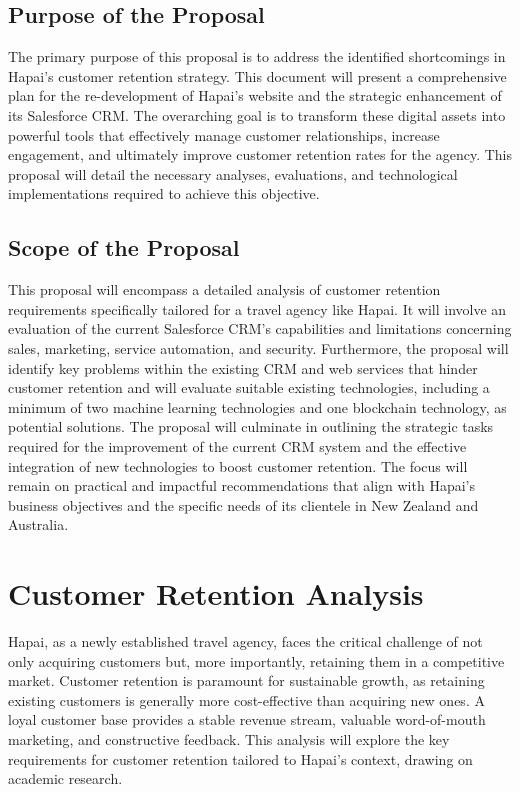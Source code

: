 \documentclass{article}
\begin{document}
\subsection{Purpose of the Proposal}
The primary purpose of this proposal is to address the identified shortcomings in Hapai's customer retention strategy. This document will present a comprehensive plan for the re-development of Hapai's website and the strategic enhancement of its Salesforce CRM. The overarching goal is to transform these digital assets into powerful tools that effectively manage customer relationships, increase engagement, and ultimately improve customer retention rates for the agency. This proposal will detail the necessary analyses, evaluations, and technological implementations required to achieve this objective.

\subsection{Scope of the Proposal}
This proposal will encompass a detailed analysis of customer retention requirements specifically tailored for a travel agency like Hapai. It will involve an evaluation of the current Salesforce CRM's capabilities and limitations concerning sales, marketing, service automation, and security. Furthermore, the proposal will identify key problems within the existing CRM and web services that hinder customer retention and will evaluate suitable existing technologies, including a minimum of two machine learning technologies and one blockchain technology, as potential solutions. The proposal will culminate in outlining the strategic tasks required for the improvement of the current CRM system and the effective integration of new technologies to boost customer retention. The focus will remain on practical and impactful recommendations that align with Hapai's business objectives and the specific needs of its clientele in New Zealand and Australia.

\section{Customer Retention Analysis }

Hapai, as a newly established travel agency, faces the critical challenge of not only acquiring customers but, more importantly, retaining them in a competitive market. Customer retention is paramount for sustainable growth, as retaining existing customers is generally more cost-effective than acquiring new ones. A loyal customer base provides a stable revenue stream, valuable word-of-mouth marketing, and constructive feedback. This analysis will explore the key requirements for customer retention tailored to Hapai's context, drawing on academic research.
\end{document}
